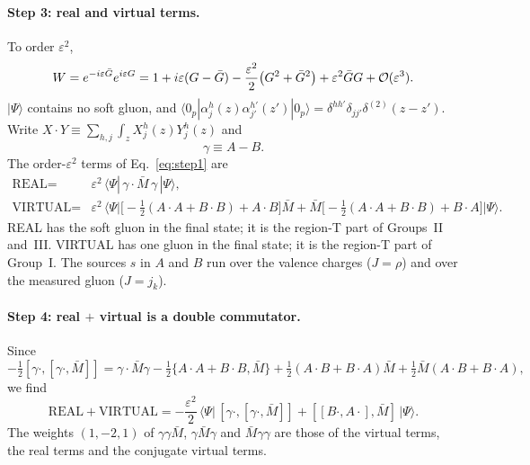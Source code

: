 \paragraph*{Step 3: real and virtual terms.} To order $\varepsilon^2$,
\begin{equation}
W=e^{-i\varepsilon\bar G}e^{i\varepsilon G}=1+i\varepsilon(G-\bar G)-\frac{\varepsilon^2}{2}\big(G^2+\bar G^2\big)+\varepsilon^2\bar GG+\mathcal{O}(\varepsilon^3).
\end{equation}
$|\Psi\rangle$ contains no soft gluon, and $\langle0_p|\alpha^h_j(z)\alpha^{h'}_{j'}(z')|0_p\rangle=\delta^{hh'}\delta_{jj'}\delta^{(2)}(z-z')$. Write $X\cdot Y\equiv\sum_{h,j}\int_zX^h_j(z)Y^h_j(z)$ and
\begin{equation}
\gamma\equiv A-B .
\end{equation}
The order-$\varepsilon^2$ terms of Eq.~\eqref{eq:step1} are
\begin{align}
\text{REAL}={}&\varepsilon^2\,\langle\Psi|\,\gamma\cdot\bar M\,\gamma\,|\Psi\rangle,\label{eq:real}\\
\text{VIRTUAL}={}&\varepsilon^2\,\Big\langle\Psi\Big|\Big[-\tfrac12(A\cdot A+B\cdot B)+A\cdot B\Big]\bar M+\bar M\Big[-\tfrac12(A\cdot A+B\cdot B)+B\cdot A\Big]\Big|\Psi\Big\rangle.\label{eq:virt}
\end{align}
REAL has the soft gluon in the final state; it is the region-T part of Groups~II and~III. VIRTUAL has one gluon in the final state; it is the region-T part of Group~I. The sources $s$ in $A$ and $B$ run over the valence charges ($J=\rho$) and over the measured gluon ($J=j_k$).

\paragraph*{Step 4: real $+$ virtual is a double commutator.} Since
\begin{equation}
-\tfrac12[\gamma\cdot,[\gamma\cdot,\bar M]]=\gamma\cdot\bar M\gamma-\tfrac12\{A\cdot A+B\cdot B,\bar M\}+\tfrac12(A\cdot B+B\cdot A)\bar M+\tfrac12\bar M(A\cdot B+B\cdot A),
\end{equation}
we find
\begin{equation}
\text{REAL}+\text{VIRTUAL}=-\frac{\varepsilon^2}{2}\,\Big\langle\Psi\Big|\,[\gamma\cdot,[\gamma\cdot,\bar M]]+[[B\cdot,A\cdot],\bar M]\,\Big|\Psi\Big\rangle .
\label{eq:dc}
\end{equation}
The weights $(1,-2,1)$ of $\gamma\gamma\bar M$, $\gamma\bar M\gamma$ and $\bar M\gamma\gamma$ are those of the virtual terms, the real terms and the conjugate virtual terms.

